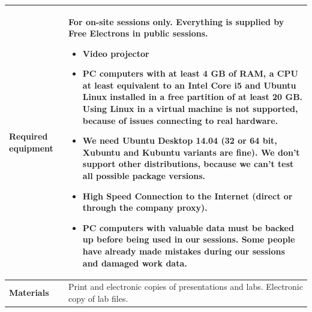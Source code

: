 \documentclass[a4paper,12pt,obeyspaces,spaces,hyphens]{article}
\begin{document}
{  \begin{tabularx}{\textwidth}{|g|h|}
    {\bf Required equipment} &
    {\bf For on-site sessions only.}
    \newline Everything is supplied by Free Electrons in public
    sessions.
    \begin{itemize}
    \item Video projector
    \item PC computers with at least 4 GB of RAM, a CPU at least
      equivalent to an Intel Core i5 and Ubuntu Linux
    installed in a {\bf free partition of at least 20 GB. Using Linux
      in a virtual machine is not supported}, because of issues
    connecting to real hardware.
    \item We need Ubuntu Desktop 14.04 (32 or 64 bit, Xubuntu and
    Kubuntu variants are fine). We don't support other
    distributions, because we can't test all possible package versions.
    \item {\bf High Speed Connection to the Internet} (direct or through the
    company proxy).
    \item {\bf PC computers with valuable data must be backed up}
    before being used in our sessions.  Some people have already made
    mistakes during our sessions and damaged work data.
    \end{itemize} \\
    \hline

    {\bf Materials} & Print and electronic copies of presentations and
    labs.
    \newline Electronic copy of lab files.\\
    \hline

\end{tabularx}}
\normalsize
\end{document}
